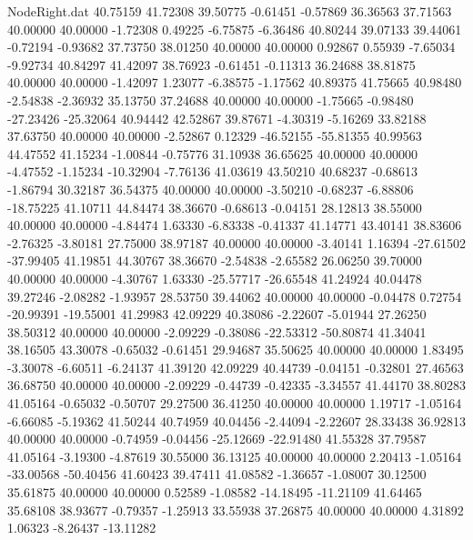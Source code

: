\begin{filecontents}{NodeRight.dat}
  40.75159   41.72308   39.50775    -0.61451   -0.57869   36.36563   37.71563   40.00000   40.00000   -1.72308    0.49225   -6.75875   -6.36486
  40.80244   39.07133   39.44061    -0.72194   -0.93682   37.73750   38.01250   40.00000   40.00000    0.92867    0.55939   -7.65034   -9.92734
  40.84297   41.42097   38.76923    -0.61451   -0.11313   36.24688   38.81875   40.00000   40.00000   -1.42097    1.23077   -6.38575   -1.17562
  40.89375   41.75665   40.98480    -2.54838   -2.36932   35.13750   37.24688   40.00000   40.00000   -1.75665   -0.98480  -27.23426  -25.32064
  40.94442   42.52867   39.87671    -4.30319   -5.16269   33.82188   37.63750   40.00000   40.00000   -2.52867    0.12329  -46.52155  -55.81355
  40.99563   44.47552   41.15234    -1.00844   -0.75776   31.10938   36.65625   40.00000   40.00000   -4.47552   -1.15234  -10.32904   -7.76136
  41.03619   43.50210   40.68237    -0.68613   -1.86794   30.32187   36.54375   40.00000   40.00000   -3.50210   -0.68237   -6.88806  -18.75225
  41.10711   44.84474   38.36670    -0.68613   -0.04151   28.12813   38.55000   40.00000   40.00000   -4.84474    1.63330   -6.83338   -0.41337
  41.14771   43.40141   38.83606    -2.76325   -3.80181   27.75000   38.97187   40.00000   40.00000   -3.40141    1.16394  -27.61502  -37.99405
  41.19851   44.30767   38.36670    -2.54838   -2.65582   26.06250   39.70000   40.00000   40.00000   -4.30767    1.63330  -25.57717  -26.65548
  41.24924   40.04478   39.27246    -2.08282   -1.93957   28.53750   39.44062   40.00000   40.00000   -0.04478    0.72754  -20.99391  -19.55001
  41.29983   42.09229   40.38086    -2.22607   -5.01944   27.26250   38.50312   40.00000   40.00000   -2.09229   -0.38086  -22.53312  -50.80874
  41.34041   38.16505   43.30078    -0.65032   -0.61451   29.94687   35.50625   40.00000   40.00000    1.83495   -3.30078   -6.60511   -6.24137
  41.39120   42.09229   40.44739    -0.04151   -0.32801   27.46563   36.68750   40.00000   40.00000   -2.09229   -0.44739   -0.42335   -3.34557
  41.44170   38.80283   41.05164    -0.65032   -0.50707   29.27500   36.41250   40.00000   40.00000    1.19717   -1.05164   -6.66085   -5.19362
  41.50244   40.74959   40.04456    -2.44094   -2.22607   28.33438   36.92813   40.00000   40.00000   -0.74959   -0.04456  -25.12669  -22.91480
  41.55328   37.79587   41.05164    -3.19300   -4.87619   30.55000   36.13125   40.00000   40.00000    2.20413   -1.05164  -33.00568  -50.40456
  41.60423   39.47411   41.08582    -1.36657   -1.08007   30.12500   35.61875   40.00000   40.00000    0.52589   -1.08582  -14.18495  -11.21109
  41.64465   35.68108   38.93677    -0.79357   -1.25913   33.55938   37.26875   40.00000   40.00000    4.31892    1.06323   -8.26437  -13.11282

\end{filecontents}
